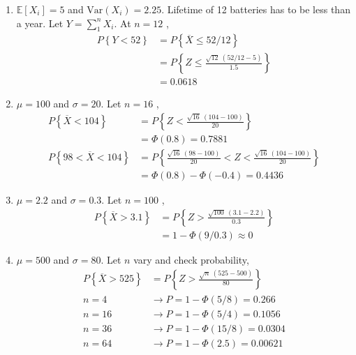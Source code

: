 \begin{enumerate}
	\item $ \mathbb{E}[X_i] = 5 $ and $ \mathrm{Var}(X_i) = 2.25 $. Lifetime of 12 batteries has to be less than a year.
	Let $ Y = \sum^n_1 X_i $. At $ n = 12 $ ,
	\begin{subequations}
		\begin{align}
			P \left\{Y < 52 \right\} &= P \left\{ \overline{X} \leq 52/12 \right\} \nonumber \\
			&= P \left\{ Z \leq \frac{\sqrt{12}\ (52/12 - 5)}{1.5} \right\} \nonumber \\
			&= 0.0618 \nonumber 
		\end{align}
	\end{subequations}
	
	\item $ \mu = 100 $ and $ \sigma = 20 $. Let $ n = 16 $ ,
	\begin{subequations}
		\begin{align}
			P \left\{\overline{X} < 104 \right\} &= P \left\{ Z < \frac{\sqrt{16}\ (104 - 100)}{20} \right\} \nonumber \\
			&= \Phi (0.8) = 0.7881 \\
			P \left\{98 < \overline{X} < 104 \right\} &= P \left\{ \frac{\sqrt{16}\ (98 - 100)}{20} < Z < \frac{\sqrt{16}\ (104 - 100)}{20} \right\} \nonumber \\
			&= \Phi (0.8) - \Phi(-0.4) = 0.4436
		\end{align}
	\end{subequations}

	\item $ \mu = 2.2 $ and $ \sigma = 0.3 $. Let $ n = 100 $ ,
	\begin{subequations}
		\begin{align}
			P \left\{\overline{X} > 3.1 \right\} &= P \left\{ Z > \frac{\sqrt{100}\ (3.1 - 2.2)}{0.3} \right\} \nonumber \\
			&= 1 - \Phi (9/0.3) \approx 0  
		\end{align}
	\end{subequations}

	\item $ \mu = 500 $ and $ \sigma = 80 $. Let $ n $ vary and check probability,
	\begin{subequations}
		\begin{align}
			P \left\{\overline{X} > 525 \right\} &= P \left\{ Z > \frac{\sqrt{n}\ (525 - 500)}{80} \right\} \\
			n = 4 &\to P = 1 - \Phi(5/8) = 0.266 \nonumber \\
			n = 16 &\to P = 1 - \Phi(5/4) = 0.1056 \nonumber \\
			n = 36 &\to P = 1 - \Phi(15/8) = 0.0304 \nonumber \\
			n = 64 &\to P = 1 - \Phi(2.5) = 0.00621 \nonumber 
		\end{align}
	\end{subequations}
	

\end{enumerate}
